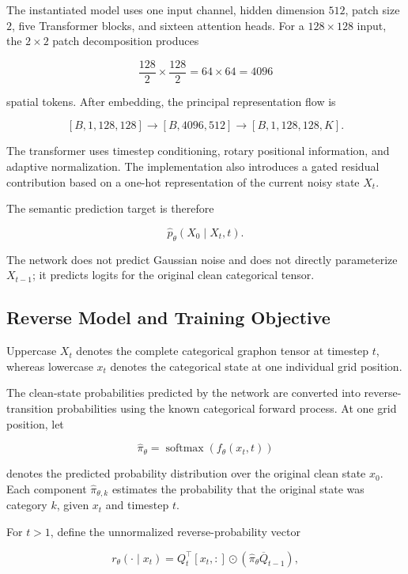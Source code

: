 The instantiated model uses one input channel, hidden dimension \(512\), patch size \(2\), five Transformer blocks, and sixteen attention heads. For a \(128\times128\) input, the \(2\times2\) patch decomposition produces

\[
\frac{128}{2}
\times
\frac{128}{2}
=
64\times64
=
4096
\]

spatial tokens. After embedding, the principal representation flow is

\[
[B,1,128,128]
\longrightarrow
[B,4096,512]
\longrightarrow
[B,1,128,128,K].
\]

The transformer uses timestep conditioning, rotary positional information, and adaptive normalization. The implementation also introduces a gated residual contribution based on a one-hot representation of the current noisy state \(X_t\).

The semantic prediction target is therefore

\[
\widehat{p}_\theta
\left(
X_0
\mid
X_t,t
\right).
\]

The network does not predict Gaussian noise and does not directly parameterize \(X_{t-1}\); it predicts logits for the original clean categorical tensor.


\subsection{Reverse Model and Training Objective}
\label{subsec:method_d3pm_objective}

Uppercase \(X_t\) denotes the complete categorical graphon tensor at timestep \(t\), whereas lowercase \(x_t\) denotes the categorical state at one individual grid position.

The clean-state probabilities predicted by the network are converted into reverse-transition probabilities using the known categorical forward process.
At one grid position, let

\[
\widehat{\pi}_\theta
=
\operatorname{softmax}
\left(
f_\theta(x_t,t)
\right)
\]

denotes the predicted probability distribution over the original clean state \(x_0\).
Each component \(\widehat{\pi}_{\theta,k}\) estimates the probability that the original state was category \(k\), given \(x_t\) and timestep \(t\).

For \(t>1\), define the unnormalized reverse-probability vector

\[
r_\theta(\cdot\mid x_t)
=
Q_t^\top[x_t,:]
\odot
\left(
\widehat{\pi}_\theta
\overline{Q}_{t-1}
\right),
\]

